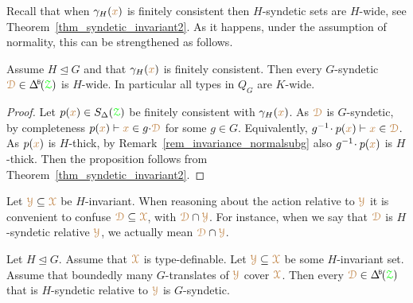 Recall that when $\gamma_H({\color{brown} x})$ is finitely consistent then $H$-syndetic sets are $H$-wide, see Theorem~\ref{thm_syndetic_invariant2}.
As it happens, under the assumption of normality, this can be strengthened as follows.

\begin{proposition}\label{prop_Gsyndetic_Hthick1}
  Assume $H\trianglelefteq G$ and that $\gamma_H({\color{brown} x})$ is finitely consistent.
  Then every $G$-syndetic $\mrD\in\BDelta(\grZ)$ is $H$-wide.
  In particular all types in $Q_G$ are $K$-wide.
\end{proposition}

\begin{proof}
  Let $p({\color{brown} x})\in S_\Delta({\color{green}\EuScript Z})$ be finitely consistent with $\gamma_H({\color{brown} x})$.
  As ${\color{brown}\EuScript D}$ is $G$-syndetic, by completeness $p({\color{brown} x})\vdash{\color{brown}x}\in g{\cdot}{\color{brown}\EuScript D}$ for some $g\in G$.
  Equivalently, $g^{-1}\!\cdot p({\color{brown} x})\vdash{\color{brown}x}\in{\color{brown}\EuScript D}$.
  As $p({\color{brown} x})$ is $H$-thick, by Remark~\ref{rem_invariance_normalsubg} also $g^{-1}\!\cdot p({\color{brown} x})$ is $H$-thick.
  Then the proposition follows from Theorem~\ref{thm_syndetic_invariant2}.
\end{proof}


Let ${\color{brown}\EuScript Y}\subseteq{\color{brown}\EuScript X}$ be $H$-invariant.
When reasoning about the action relative to ${\color{brown}\EuScript Y}$ it is convenient to confuse ${\color{brown}\EuScript D}\subseteq{\color{brown}\EuScript X}$, with ${\color{brown}\EuScript D}\cap{\color{brown}\EuScript Y}$.
For instance, when we say that ${\color{brown}\EuScript D}$ is $H$-syndetic relative ${\color{brown}\EuScript Y}$, we actually mean ${\color{brown}\EuScript D}\cap{\color{brown}\EuScript Y}$.

\begin{proposition}\label{prop_HgenGgen}
  Let $H\trianglelefteq G$.
  Assume that ${\color{brown}\EuScript X}$ is type-definable.
  Let ${\color{brown}\EuScript Y}\subseteq{\color{brown}\EuScript X}$ be some $H$-invariant set.
  Assume that boundedly many $G$-translates of ${\color{brown}\EuScript Y}$ cover ${\color{brown}\EuScript X}$.
  Then every $\mrD\in\BDelta(\grZ)$ that is $H$-syndetic relative to ${\color{brown}\EuScript Y}$ is $G$-syndetic.
\end{proposition}

